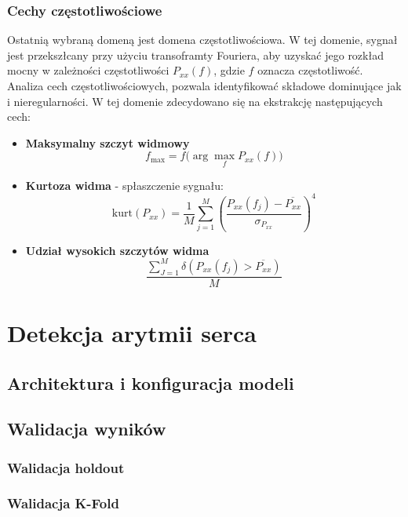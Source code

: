 \documentclass[a4paper,twoside,12pt]{book}
\begin{document}
\subsection{Cechy częstotliwościowe}
Ostatnią wybraną domeną jest domena częstotliwościowa. W tej domenie, sygnał jest przekszłcany przy użyciu transoframty Fouriera, aby uzyskać jego rozkład mocny w zależności częstotliwości $P_{xx}(f)$, gdzie $f$ oznacza częstotliwość. Analiza cech częstotliwościowych, pozwala identyfikować składowe dominujące jak i nieregularności. W tej domenie zdecydowano się na ekstrakcję następujących cech:
\begin{itemize}
	\setcounter{enumi}{9}
	\item \textbf{Maksymalny szczyt widmowy}
	      \begin{equation}
		      f_{\max} = f \bigl( \arg\max_{f} P_{xx}(f) \bigr)
	      \end{equation}


	\item \textbf{Kurtoza widma} - spłaszczenie sygnału:
	      \begin{equation}
		      \text{kurt}(P_{xx}) = \frac{1}{M} \sum_{j=1}^M \left( \frac{P_{xx}(f_j) - \overline{P_{xx}}}{\sigma_{P_{xx}}} \right)^4
	      \end{equation}

	\item \textbf{Udział wysokich szczytów widma}
	      \begin{equation}
		      \frac{\sum_{J=1}^{M} \delta(P_{xx}(f_j) > \overline{P_{xx}} )}{M}
	      \end{equation}
\end{itemize}



\chapter{Detekcja arytmii serca}
\section{Architektura i konfiguracja modeli}
\section{Walidacja wyników}
\subsection{Walidacja holdout}
\subsection{Walidacja K-Fold}
\end{document}
